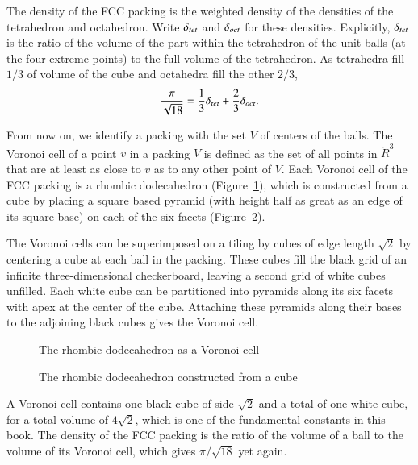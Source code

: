 The density of the FCC packing is the weighted density
of the densities of the tetrahedron and octahedron.  Write $\delta_{tet}$ and
$\delta_{oct}$ for these densities.  Explicitly, $\delta_{tet}$ is the ratio of the
volume of the part within the tetrahedron of the unit balls (at the
four extreme points) to the full volume of the tetrahedron.  As tetrahedra fill
$1/3$ of volume of the cube and octahedra fill
the other $2/3$,
\begin{displaymath}
  \frac{\pi}{\sqrt{18}} = \frac{1}{3}\delta_{tet} + \frac{2}{3}\delta_{oct}.
\end{displaymath}

From now on, we identify a packing with the set $V$ of centers of the balls.
The Voronoi cell of a point $v$ in a packing $V$ is defined as the set of all
points in $\ring{R}^3$ 
that are at least as close to $v$ as to any other point
of $V$.  Each Voronoi cell of the FCC packing is a
rhombic dodecahedron (Figure~\ref{fig:rhombic}),  %
which is constructed from a cube by placing a
square based pyramid (with height half as great as an edge of its
square base) on each of the six facets
(Figure~\ref{fig:rhombic-cube}).  %

The Voronoi cells can be superimposed on a tiling by cubes of edge length $\sqrt2$ by
centering a cube at each ball in the packing. These
cubes fill the black grid of an infinite three-dimensional
checkerboard, leaving a second grid of white cubes unfilled.  Each
white cube can be partitioned into pyramids along its six facets with apex
at the center of the cube.  Attaching these pyramids along their bases
to the adjoining black cubes gives the Voronoi cell.

\begin{figure}[htb]
  \centering
  \caption{The rhombic dodecahedron as a Voronoi cell}
  \label{fig:rhombic}
\end{figure}

\begin{figure}[htb]
  \centering
  \caption{The rhombic dodecahedron constructed from a cube}
  \label{fig:rhombic-cube}
\end{figure}

A Voronoi cell contains one black cube of side $\sqrt2$ and a total
of one white cube, for a total volume of $4\sqrt2$, which is
one of the fundamental constants in this book.  The density of the
FCC packing is the ratio of the volume of a ball to the volume
of its Voronoi cell, which gives $\pi/\sqrt{18}$ yet again.





